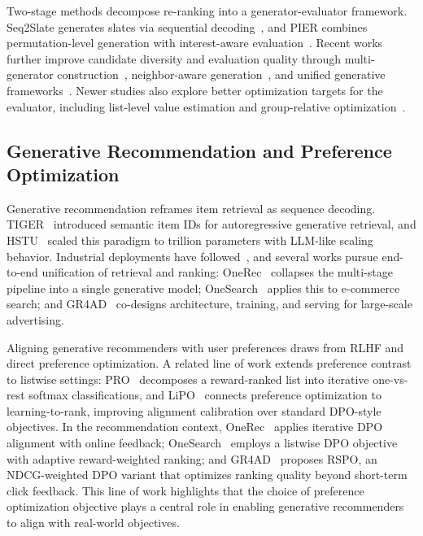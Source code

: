 \documentclass[sigconf]{acmart}
\begin{document}
Two-stage methods decompose re-ranking into a generator-evaluator framework. Seq2Slate generates slates via sequential decoding~\cite{bello2018seq2slate}, and PIER combines permutation-level generation with interest-aware evaluation~\cite{shi2023pier}. Recent works further improve candidate diversity and evaluation quality through multi-generator construction~\cite{yang2025comprehensive}, neighbor-aware generation~\cite{wang2025nlgr}, and unified generative frameworks~\cite{lin2025gref}. Newer studies also explore better optimization targets for the evaluator, including list-level value estimation and group-relative optimization~\cite{zhang2025generation, zhang2025goalrank}.
\subsection{Generative Recommendation and Preference Optimization}
Generative recommendation reframes item retrieval as sequence decoding. TIGER~\cite{rajput2023recommender} introduced semantic item IDs for autoregressive generative retrieval, and HSTU~\cite{zhai2024actions} scaled this paradigm to trillion parameters with LLM-like scaling behavior. Industrial deployments have followed~\cite{han2025mtgr, zhang2025gpr, ju2025generative, yang2025sparse}, and several works pursue end-to-end unification of retrieval and ranking: OneRec~\cite{deng2025onerec, zhou2025onerec} collapses the multi-stage pipeline into a single generative model; OneSearch~\cite{chen2025onesearch} applies this to e-commerce search; and GR4AD~\cite{xue2026generative} co-designs architecture, training, and serving for large-scale advertising.

Aligning generative recommenders with user preferences draws from RLHF and direct preference optimization. A related line of work extends preference contrast to listwise settings: PRO~\cite{song2024preference} decomposes a reward-ranked list into iterative one-vs-rest softmax classifications, and LiPO~\cite{liu2025lipo} connects preference optimization to learning-to-rank, improving alignment calibration over standard DPO-style objectives. In the recommendation context, OneRec~\cite{deng2025onerec, zhou2025onerec} applies iterative DPO alignment with online feedback; OneSearch~\cite{chen2025onesearch} employs a listwise DPO objective with adaptive reward-weighted ranking; and GR4AD~\cite{xue2026generative} proposes RSPO, an NDCG-weighted DPO variant that optimizes ranking quality beyond short-term click feedback. This line of work highlights that the choice of preference optimization objective plays a central role in enabling generative recommenders to align with real-world objectives.
\end{document}

